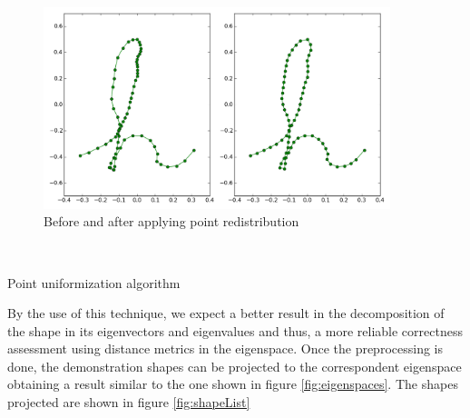 \begin{figure}[h!]
        \centering
        \includegraphics[width=0.9\textwidth]{figures/pointRedis.png}
        \caption{Before and after applying point redistribution}
        \label{fig:pointRedis}
\end{figure}
~
\begin{algorithm}[H]
 \scriptsize
  \caption{Point uniformization algorithm}
  \label{al:points}
\end{algorithm}
\vspace{1cm}
By the use of this technique, we expect a better result in the decomposition of the shape in its eigenvectors and eigenvalues and thus, a more reliable correctness assessment using distance metrics in the eigenspace. Once the preprocessing is done, the demonstration shapes can be projected to the correspondent eigenspace obtaining a result similar to the one shown in figure \ref{fig:eigenspaces}. The shapes projected are shown in figure \ref{fig:shapeList}

